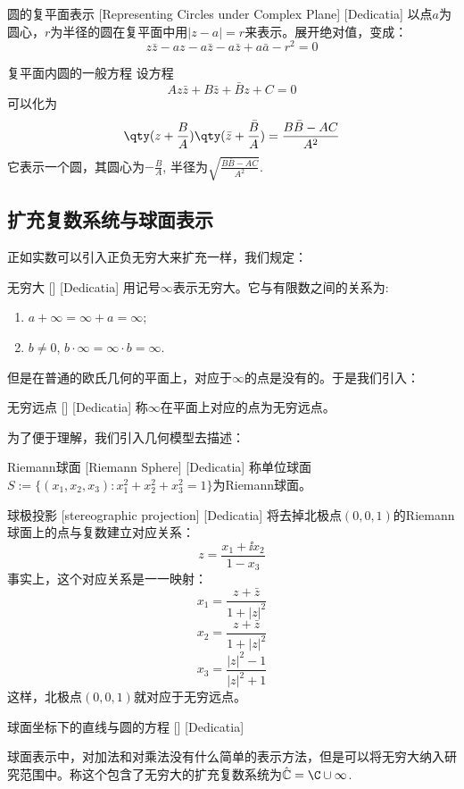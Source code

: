 \documentclass[UTF8]{ctexart}
\begin{document}
\begin{dfn}
    [CircleComplexRepresenting]
    {圆的复平面表示}
    [Representing Circles under Complex Plane]
    [Dedicatia]
    以点$a$为圆心，$r$为半径的圆在复平面中用$|z-a|=r$来表示。展开绝对值，变成：
    \[z\bar{z}-az-a\bar{z}-a\bar{z}+a\bar{a}-r^2=0\]
\end{dfn}
\begin{dfn}
    {复平面内圆的一般方程}
    设方程
    \[Az\bar{z}+B\bar{z}+\bar{B}z+C=0\]
    可以化为
    \[\qty(z+\frac{B}{A})\qty(\bar{z}+\frac{\bar{B}}{A})=\frac{B\bar{B}-AC}{A^2}\]
    它表示一个圆，其圆心为$-\frac{B}{A}$, 半径为$\sqrt{\frac{B\bar{B}-AC}{A^2}}$.
\end{dfn}
\subsection{扩充复数系统与球面表示}
正如实数可以引入正负无穷大来扩充一样，我们规定：
\begin{dfn}
    [UUID]
    {无穷大}
    []
    [Dedicatia]
    用记号$\infty$表示无穷大。它与有限数之间的关系为:
    \begin{enumerate}
        \item $a+\infty=\infty+a=\infty$;
        \item $b\neq 0$, $b\cdot\infty=\infty\cdot b=\infty$.
    \end{enumerate}
\end{dfn}
但是在普通的欧氏几何的平面上，对应于$\infty$的点是没有的。于是我们引入：
\begin{dfn}
    [UUID]
    {无穷远点}
    []
    [Dedicatia]
    称$\infty$在平面上对应的点为无穷远点。
\end{dfn}
为了便于理解，我们引入几何模型去描述：
\begin{dfn}
    [UUID]
    {Riemann球面}
    [Riemann Sphere]
    [Dedicatia]
    称单位球面$S:=\{(x_1,x_2,x_3):x_1^2+x_2^2+x_3^2=1\}$为Riemann球面。
\end{dfn}
\begin{ppt}
    [UUID]
    {球极投影}
    [stereographic projection]
    [Dedicatia]
    将去掉北极点$(0,0,1)$的Riemann球面上的点与复数建立对应关系：
    \[z=\frac{x_1+\ii x_2}{1-x_3}\]
    事实上，这个对应关系是一一映射：
    \[x_1=\frac{z+\bar{z}}{1+|z|^2}\]
    \[x_2=\frac{z+\bar{z}}{1+|z|^2}\]
    \[x_3=\frac{|z|^2-1}{|z|^2+1}\]
    这样，北极点$(0,0,1)$就对应于无穷远点。
\end{ppt}
\begin{ppt}
    [UUID]
    {球面坐标下的直线与圆的方程}
    []
    [Dedicatia]
\end{ppt}
球面表示中，对加法和对乘法没有什么简单的表示方法，但是可以将无穷大纳入研究范围中。称这个包含了无穷大的扩充复数系统为$\hat{\mathbb{C}}=\C\cup\infty $.
\end{document}
